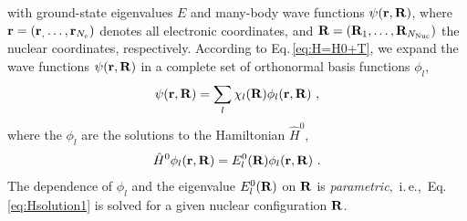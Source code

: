 with ground-state eigenvalues $E$ and many-body wave functions \mbox{$\psi ({\bf r}, {\bf R})$},
where \mbox{${\bf r} = ({\bf r}_, \ldots, {\bf r}_{N_{\rm e}})$} denotes all electronic coordinates, and ${\bf R} = ({\bf R}_1, \ldots, {\bf R}_{N_{\rm Nuc}})$ the nuclear coordinates, respectively. According to Eq.\,\eqref{eq:H=H0+T}, we expand the wave functions $\psi ({\bf r}, {\bf R})$ in a complete set of orthonormal basis functions $\phi_l$,
\begin{align}
\psi ({\bf r}, {\bf R}) = \sum_l \chi_l ({\bf R}) \phi_l ({\bf r}, {\bf R})~,
\label{eq:psi_expansion_phi}
\end{align}
where the $\phi_l$ are the solutions to the Hamiltonian $\hat{H}^0$,
\begin{align}
    \hat{H}^0 \phi_l ({\bf r}, {\bf R})
        = E^0_l ({\bf R}) \phi_l ({\bf r}, {\bf R})~.
    \label{eq:Hsolution1}
\end{align}
The dependence of $\phi_l$ and the eigenvalue $E_l^0({\bf R})$ on $\bf R$ is \emph{parametric},~i.\,e.,~Eq.\,\eqref{eq:Hsolution1} is solved for a given nuclear configuration $\bf R$.

